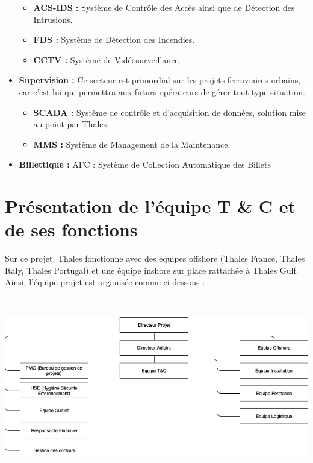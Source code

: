 \begin{itemize}
\begin{itemize}
\item \textbf{\gls{ACS-IDS} :} Système de Contrôle des Accès ainsi que de Détection des Intrusions.
\item \textbf{\gls{FDS} :} Système de Détection des Incendies.
\item \textbf{\gls{CCTV} :} Système de Vidéosurveillance.
\end{itemize}
\item \textbf{Supervision :} Ce secteur est primordial sur les projets ferroviaires urbains, car c'est lui qui permettra aux futurs opérateurs de gérer tout type situation.
\begin{itemize}
\item \textbf{\gls{SCADA} :} Système de contrôle et d'acquisition de données, solution mise au point par Thales.
\item \textbf{\gls{MMS} :} Système de Management de la Maintenance.
\end{itemize}
\item \textbf{Billettique :} \gls{AFC} : Système de Collection Automatique des Billets
\end{itemize}


\section{Présentation de l'équipe T \& C et de ses fonctions}

Sur ce projet, Thales fonctionne avec des équipes offshore (Thales France, Thales Italy, Thales Portugal) et une équipe inshore sur place rattachée à Thales Gulf.
Ainsi, l'équipe projet est organisée comme ci-dessous :

\begin{center}
\includegraphics[height=8cm]{ressources/images/figures/OBS1.png}
\end{center}

